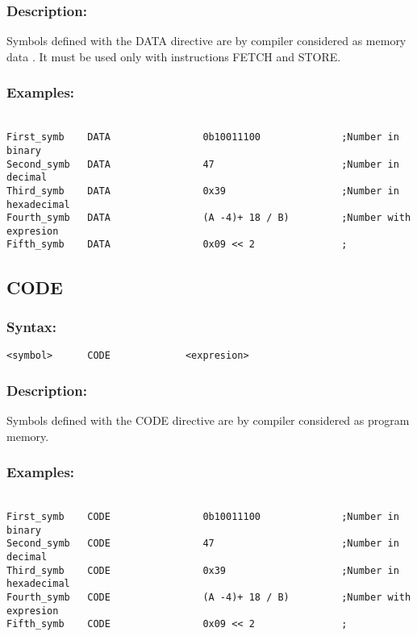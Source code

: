         \subsubsection{Description:}
            Symbols defined with the DATA directive are by compiler considered as memory data . It must be used only with instructions FETCH and STORE.

        \subsubsection{Examples:}
            {
                ~\\
                \usecodefont
                \verb'First_symb    DATA                0b10011100              ;Number in binary'\\
                \verb'Second_symb   DATA                47                      ;Number in decimal'\\
                \verb'Third_symb    DATA                0x39                    ;Number in hexadecimal'\\
                \verb'Fourth_symb   DATA                (A -4)+ 18 / B)         ;Number with expresion'\\
                \verb'Fifth_symb    DATA                0x09 << 2               ;'\\
            }
            
    \subsection{CODE}
        \subsubsection{Syntax:}
            \verb'<symbol>      CODE             <expresion>'
        \subsubsection{Description:}
        Symbols defined with the CODE directive are by compiler considered as program memory.

        \subsubsection{Examples:}
            {
                ~\\
                \usecodefont
                \verb'First_symb    CODE                0b10011100              ;Number in binary'\\
                \verb'Second_symb   CODE                47                      ;Number in decimal'\\
                \verb'Third_symb    CODE                0x39                    ;Number in hexadecimal'\\
                \verb'Fourth_symb   CODE                (A -4)+ 18 / B)         ;Number with expresion'\\
                \verb'Fifth_symb    CODE                0x09 << 2               ;'\\
            }
            
